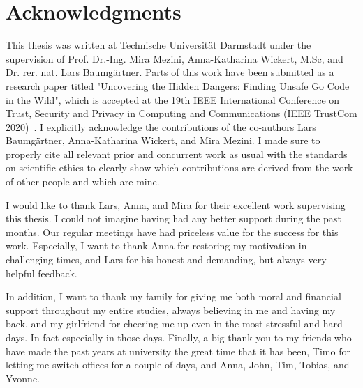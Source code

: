 \chapter*{Acknowledgments}

This thesis was written at Technische Universität Darmstadt under the supervision of Prof. Dr.-Ing. Mira Mezini,
Anna-Katharina Wickert, M.Sc, and Dr. rer. nat. Lars Baumgärtner.
Parts of this work have been submitted as a research paper titled "Uncovering the Hidden Dangers: Finding Unsafe Go Code
in the Wild", which is accepted at the 19th IEEE International Conference on Trust, Security and Privacy in
Computing and Communications (IEEE TrustCom 2020)~\cite{lauinger2020}.
I explicitly acknowledge the contributions of the co-authors Lars Baumgärtner, Anna-Katharina Wickert, and Mira Mezini.
I made sure to properly cite all relevant prior and concurrent work as usual with the standards on scientific ethics
to clearly show which contributions are derived from the work of other people and which are mine.

I would like to thank Lars, Anna, and Mira for their excellent work supervising this thesis.
I could not imagine having had any better support during the past months.
Our regular meetings have had priceless value for the success for this work.
Especially, I want to thank Anna for restoring my motivation in challenging times, and Lars for his honest and
demanding, but always very helpful feedback.

In addition, I want to thank my family for giving me both moral and financial support throughout my entire studies,
always believing in me and having my back, and my girlfriend for cheering me up even in the most stressful and hard
days.
In fact especially in those days.
Finally, a big thank you to my friends who have made the past years at university the great time that it has been, Timo
for letting me switch offices for a couple of days, and Anna, John, Tim, Tobias, and Yvonne.
